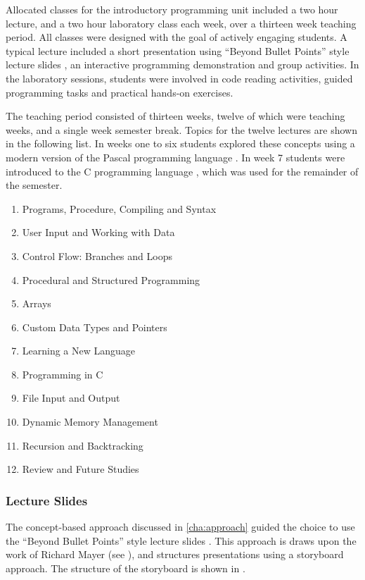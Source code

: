 Allocated classes for the introductory programming unit included a two hour lecture, and a two hour laboratory class each week, over a thirteen week teaching period. All classes were designed with the goal of actively engaging students. A typical lecture included a short presentation using ``Beyond Bullet Points'' style lecture slides \cite{Atkinson:2007}, an interactive programming demonstration and group activities. In the laboratory sessions, students were involved in code reading activities, guided programming tasks and practical hands-on exercises.

The teaching period consisted of thirteen weeks, twelve of which were teaching weeks, and a single week semester break. Topics for the twelve lectures are shown in the following list. In weeks one to six students explored these concepts using a modern version of the Pascal programming language \cite{Wirth:1971,FPC:2011}. In week 7 students were introduced to the C programming language \cite{Ritchie:1978}, which was used for the remainder of the semester. 

\begin{enumerate}
  \item Programs, Procedure, Compiling and Syntax
  \item User Input and Working with Data
  \item Control Flow: Branches and Loops
  \item Procedural and Structured Programming
  \item Arrays
  \item Custom Data Types and Pointers
  \item Learning a New Language
  \item Programming in C
  \item File Input and Output
  \item Dynamic Memory Management
  \item Recursion and Backtracking
  \item Review and Future Studies
\end{enumerate}

\subsubsection{Lecture Slides} %
\label{ssub:lecture_slides}

The concept-based approach discussed in \cref{cha:approach} guided the choice to use the ``Beyond Bullet Points'' style lecture slides \cite{Atkinson:2007}. This approach is draws upon the work of Richard Mayer (see \citet{Mayer:2005}), and structures presentations using a storyboard approach. The structure of the storyboard is shown in .

